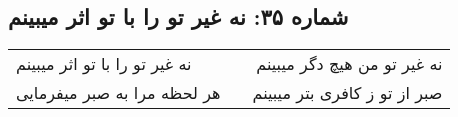 \begin{center}
\section*{شماره ۳۵: نه غیر تو را با تو اثر میبینم}
\label{sec:035}
\begin{longtable}{l p{0.5cm} r}
نه غیر تو را با تو اثر میبینم
&&
نه غیر تو من هیچ دگر میبینم
\\
هر لحظه مرا به صبر میفرمایی
&&
صبر از تو ز کافری بتر میبینم
\\
\end{longtable}
\end{center}
